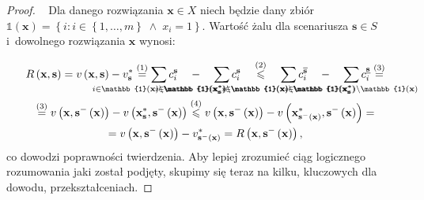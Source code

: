 \begin{proof}~\cite[$431$]{minmaxSurvey}
	Dla danego rozwiązania $\textbf{x} \in X$ niech będzie dany zbiór $\mathbb{1} \left( \textbf{x} \right) = \left\{ i : i \in \left\{ 1, \dots, m \right\} \; \wedge \; x_{i} = 1 \right\}$.
	Wartość żalu dla scenariusza $\textbf{s} \in S$ i~dowolnego rozwiązania $\textbf{x}$ wynosi:
	
	\begin{gather*}
		R \left( \textbf{x}, \textbf{s} \right) = v \left( \textbf{x}, \textbf{s} \right) - v^{\ast}_{\textbf{s}} \overset{\left( 1 \right)}{=} \sum_{\mathclap{i \in \mathbb{1} \left( \textbf{x} \right) \setminus \mathbb{1} \left( \textbf{x}^{\ast}_{\textbf{s}} \right)}} c_{i}^{\textbf{s}} \quad - \quad \sum_{\mathclap{i \in \mathbb{1} \left( \textbf{x}^{\ast}_{\textbf{s}} \right) \setminus \mathbb{1} \left( \textbf{x} \right)}} c_{i}^{\textbf{s}} \quad \overset{\left( 2 \right)}{\leqslant} \quad \sum_{\mathclap{i \in \mathbb{1} \left( \textbf{x} \right) \setminus \mathbb{1} \left( \textbf{x}^{\ast}_{\textbf{s}} \right)}} c^{\overline{\textbf{s}}}_{i} \quad - \quad \sum_{\mathclap{i \in \mathbb{1} \left( \textbf{x}^{\ast}_{\textbf{s}} \right) \setminus \mathbb{1} \left( \textbf{x} \right)}} c^{\underline{\textbf{s}}}_{i} \overset{\left( 3 \right)}{=} \\ 
		\overset{\left( 3 \right)}{=} v \left( \textbf{x}, \textbf{s}^{-} \left( \textbf{x} \right) \right) - v \left( \textbf{x}^{\ast}_{\textbf{s}}, \textbf{s}^{-} \left( \textbf{x} \right) \right) \overset{\left( 4 \right)}{\leqslant} v \left( \textbf{x}, \textbf{s}^{-} \left( \textbf{x} \right) \right) - v \left( \textbf{x}^{\ast}_{\textbf{s}^{-} \left( \textbf{x} \right)}, \textbf{s}^{-} \left( \textbf{x} \right) \right) = \\ 
		= v \left( \textbf{x}, \textbf{s}^{-} \left( \textbf{x} \right) \right) - v^{\ast}_{\textbf{s}^{-} \left( \textbf{x} \right)} = R \left( \textbf{x}, \textbf{s}^{-} \left( \textbf{x} \right) \right)\text{,}
	\end{gather*}
	co dowodzi poprawności twierdzenia.
	Aby lepiej zrozumieć ciąg logicznego rozumowania jaki został podjęty, skupimy się teraz na kilku, kluczowych dla dowodu, przekształceniach.
	

\end{proof}

